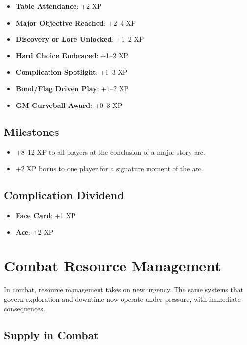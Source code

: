 \begin{itemize}
    \item \textbf{Table Attendance}: +2 XP
    \item \textbf{Major Objective Reached}: +2--4 XP
    \item \textbf{Discovery or Lore Unlocked}: +1--2 XP
    \item \textbf{Hard Choice Embraced}: +1--2 XP
    \item \textbf{Complication Spotlight}: +1--3 XP
    \item \textbf{Bond/Flag Driven Play}: +1--2 XP
    \item \textbf{GM Curveball Award}: +0--3 XP
\end{itemize}

\subsection*{Milestones}

\begin{itemize}
    \item +8--12 XP to all players at the conclusion of a major story arc.
    \item +2 XP bonus to one player for a signature moment of the arc.
\end{itemize}

\subsection*{Complication Dividend}

\begin{itemize}
    \item \textbf{Face Card}: +1 XP
    \item \textbf{Ace}: +2 XP
\end{itemize}

\section*{Combat Resource Management}

In combat, resource management takes on new urgency. The same systems that govern exploration and downtime now operate under pressure, with immediate consequences.

\subsection*{Supply in Combat}

